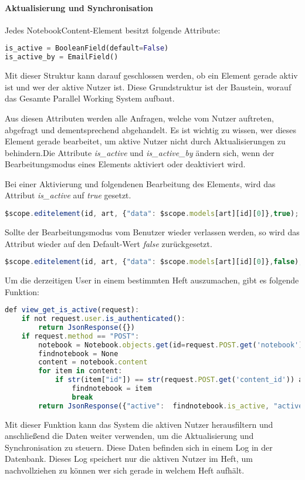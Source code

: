 \paragraph{Aktualisierung und Synchronisation}
Jedes NotebookContent-Element besitzt folgende Attribute:
\begin{lstlisting}[caption={Parallel Working System Attribute}, language=Python]
is_active = BooleanField(default=False)
is_active_by = EmailField()
\end{lstlisting}
Mit dieser Struktur kann darauf geschlossen werden, ob ein Element gerade aktiv ist und wer der aktive Nutzer ist. Diese Grundstruktur ist der Baustein, worauf das Gesamte Parallel Working System aufbaut.

Aus diesen Attributen werden alle Anfragen, welche vom Nutzer auftreten, abgefragt und dementsprechend abgehandelt. Es ist wichtig zu wissen, wer dieses Element gerade bearbeitet, um aktive Nutzer nicht durch Aktualisierungen zu behindern.Die Attribute \textit{is\_active} und \textit{is\_active\_by} ändern sich, wenn der Bearbeitungsmodus eines Elements aktiviert oder deaktiviert wird.

Bei einer Aktivierung und folgendenen Bearbeitung des Elements, wird das Attribut \textit{is\_active} auf \textit{true} gesetzt.
\begin{lstlisting}[caption={Bearbeitungsmodus true - PWS}, language=Javascript]
$scope.editelement(id, art, {"data": $scope.models[art][id][0]},true);
\end{lstlisting}

Sollte der Bearbeitungsmodus vom Benutzer wieder verlassen werden, so wird das Attribut wieder auf den Default-Wert \textit{false} zurückgesetzt.
\begin{lstlisting}[caption={Bearbeitungsmodus false - PWS}, language=Javascript]
$scope.editelement(id, art, {"data": $scope.models[art][id][0]},false);
\end{lstlisting}

Um die derzeitigen User in einem bestimmten Heft auszumachen, gibt es folgende Funktion:
\begin{lstlisting}[caption={Abfrage der aktiven Nutzer - PWS}, language=Javascript]
def view_get_is_active(request):
    if not request.user.is_authenticated():
        return JsonResponse({})
    if request.method == "POST":
        notebook = Notebook.objects.get(id=request.POST.get('notebook'))
        findnotebook = None
        content = notebook.content
        for item in content:
            if str(item["id"]) == str(request.POST.get('content_id')) and item["art"] == request.POST.get('content_art'):
                findnotebook = item
                break
        return JsonResponse({"active":  findnotebook.is_active, "active_by": findnotebook.is_active_by})
\end{lstlisting}
Mit dieser Funktion kann das System die aktiven Nutzer herausfiltern und anschließend die Daten weiter verwenden, um die Aktualisierung und Synchronisation zu steuern. Diese Daten befinden sich in einem Log in der Datenbank. Dieses Log speichert nur die aktiven Nutzer im Heft, um nachvollziehen zu können wer sich gerade in welchem Heft aufhält.

